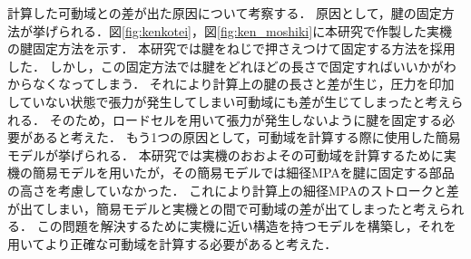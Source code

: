 \documentclass{jarticle}
\begin{document}
計算した可動域との差が出た原因について考察する．
原因として，腱の固定方法が挙げられる．図\ref{fig:kenkotei}，図\ref{fig:ken_moshiki}に本研究で作製した実機の腱固定方法を示す．
本研究では腱をねじで押さえつけて固定する方法を採用した．
しかし，この固定方法では腱をどれほどの長さで固定すればいいかがわからなくなってしまう．
それにより計算上の腱の長さと差が生じ，圧力を印加していない状態で張力が発生してしまい可動域にも差が生じてしまったと考えられる．
そのため，ロードセルを用いて張力が発生しないように腱を固定する必要があると考えた．
もう1つの原因として，可動域を計算する際に使用した簡易モデルが挙げられる．
本研究では実機のおおよその可動域を計算するために実機の簡易モデルを用いたが，その簡易モデルでは細径MPAを腱に固定する部品の高さを考慮していなかった．
これにより計算上の細径MPAのストロークと差が出てしまい，簡易モデルと実機との間で可動域の差が出てしまったと考えられる．
この問題を解決するために実機に近い構造を持つモデルを構築し，それを用いてより正確な可動域を計算する必要があると考えた．
\end{document}
